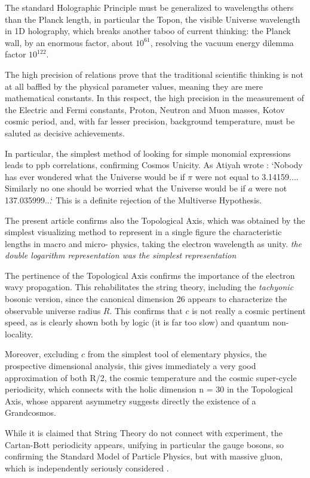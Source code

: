\documentclass[twoside,draft]{article}
\begin{document}
\begin{sloppypar}
The standard Holographic Principle must be generalized to wavelengths others than the Planck
length, in particular the Topon, the visible Universe wavelength in 1D holography, which breaks
another taboo of current thinking: the Planck wall, by an enormous factor, about $10^{61}$, resolving the
vacuum energy dilemma factor $10^{122}$.

The high precision of relations prove that the traditional scientific thinking is not at all baffled by
the physical parameter values, meaning they are mere mathematical constants. In this respect, the
high precision in the measurement of the Electric and Fermi constants, Proton, Neutron and Muon masses, Kotov cosmic period, and, with far lesser precision, background temperature, must be saluted as decisive achievements.

In particular, the simplest method of looking for simple monomial expressions leads to ppb correlations, confirming Cosmos Unicity. As Atiyah wrote \cite{Koide}: `Nobody has
ever wondered what the Universe would be if $\pi$ were not equal to 3.14159.... Similarly no one
should be worried what the Universe would be if $a$ were not 137.035999...` This is a definite
rejection of the Multiverse Hypothesis.

The present article confirms also the Topological Axis, which was obtained by the simplest
visualizing method to represent in a single figure the characteristic lengths in macro and micro-
physics, taking the electron wavelength as unity. \textit {the double logarithm representation was the simplest representation}

The pertinence of the Topological Axis confirms
the importance of the electron wavy propagation. This rehabilitates the string theory, including the
\textit{tachyonic} bosonic version, since the canonical dimension 26 appears to characterize the observable
universe radius $R$. This confirms that $c$ is not really a cosmic pertinent speed, as is clearly shown both by
logic (it is far too slow) and quantum non-locality.

Moreover, excluding $c$ from the simplest tool of elementary physics, the prospective dimensional
analysis, this gives immediately a very good approximation of both R/2, the cosmic temperature and the cosmic super-cycle periodicity, which connects with the holic dimension n = 30 in the
Topological Axis, whose apparent asymmetry suggests directly the existence of a Grandcosmos.

While it is claimed that String Theory do not connect with experiment, the Cartan-Bott periodicity
appears, unifying in particular the gauge bosons, so confirming the Standard Model of Particle Physics, but with
massive gluon, which is independently seriously considered \cite{Salingaros}.


\end{sloppypar}
\end{document}
